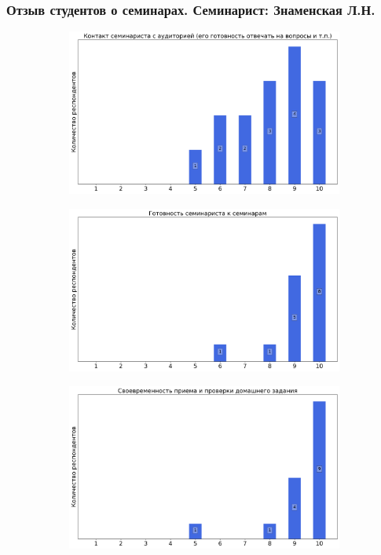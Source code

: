 	\subsubsection{Отзыв студентов о семинарах. Семинарист: Знаменская Л.Н.}		
		\begin{figure}[H]
			\centering
			\begin{subfigure}[b]{0.45\textwidth}
				\centering
				\includegraphics[width=\textwidth]{images/1 course/Математический анализ/seminarists-marks-Знаменская Л.Н.-0.png}
			\end{subfigure}
			\begin{subfigure}[b]{0.45\textwidth}
				\centering
				\includegraphics[width=\textwidth]{images/1 course/Математический анализ/seminarists-marks-Знаменская Л.Н.-1.png}
			\end{subfigure}
			\begin{subfigure}[b]{0.45\textwidth}
				\centering
				\includegraphics[width=\textwidth]{images/1 course/Математический анализ/seminarists-marks-Знаменская Л.Н.-2.png}

\end{subfigure}
\end{figure}
